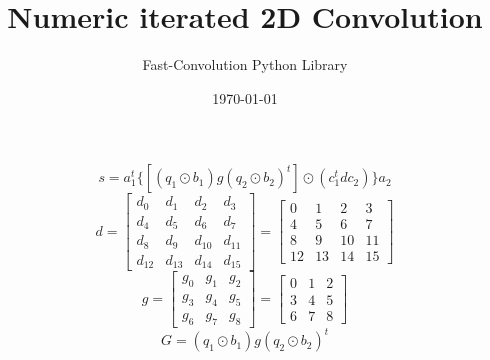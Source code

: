 \documentclass{article}%
\title{Numeric iterated 2D Convolution}%
\author{Fast{-}Convolution Python Library}%
\date{\today}%
\begin{document}
%
\normalsize%
\maketitle%
\[%
s=a_1^t \{[(q_1 \odot b_1) g (q_2 \odot b_2)^t] \odot (c_1^t d c_2)\}a_2%
\]%
\[%
d = \left[\begin{matrix}d_{0} & d_{1} & d_{2} & d_{3}\\d_{4} & d_{5} & d_{6} & d_{7}\\d_{8} & d_{9} & d_{10} & d_{11}\\d_{12} & d_{13} & d_{14} & d_{15}\end{matrix}\right] = \left[\begin{matrix}0 & 1 & 2 & 3\\4 & 5 & 6 & 7\\8 & 9 & 10 & 11\\12 & 13 & 14 & 15\end{matrix}\right]%
\]%
\[%
g = \left[\begin{matrix}g_{0} & g_{1} & g_{2}\\g_{3} & g_{4} & g_{5}\\g_{6} & g_{7} & g_{8}\end{matrix}\right] = \left[\begin{matrix}0 & 1 & 2\\3 & 4 & 5\\6 & 7 & 8\end{matrix}\right]%
\]%
\[%
G = (q_1 \odot b_1) g (q_2 \odot b_2)^t%
\]%
\end{document}
